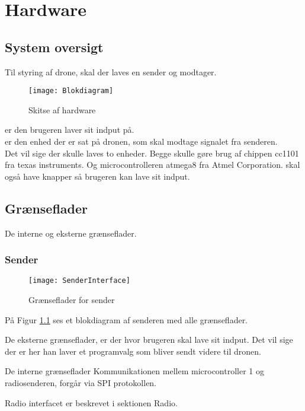 \documentclass[Main]{subfiles}
\begin{document}
\chapter{Hardware}

\section{System oversigt}

Til styring af drone, skal der laves en sender og modtager.

\begin{figure}[H]
\centering
\texttt{[image: Blokdiagram]}
\caption{Skitse af hardware}
\end{figure}

 er den brugeren laver sit indput på. 
\\  er den enhed der er sat på dronen, som skal modtage signalet fra senderen.\\
Det vil sige der skulle laves to enheder. Begge skulle gøre brug af chippen cc1101 fra texas instruments. Og microcontrolleren atmega8 fra Atmel Corporation.
 skal også have knapper så brugeren kan lave sit indput.

\section{Grænseflader}

De interne og eksterne grænseflader. 

\subsection{Sender}
\begin{figure}[H]
\centering
\texttt{[image: SenderInterface]}
\caption{Grænseflader for sender}
\label{fig: SenderInterface}
\end{figure}

På Figur \ref{fig: SenderInterface} ses et blokdiagram af senderen med alle grænseflader.

De eksterne grænseflader, er der hvor brugeren skal lave sit indput. Det vil sige der er her han laver et programvalg som bliver sendt videre til dronen.

De interne grænseflader
Kommunikationen mellem microcontroller 1 og radiosenderen, forgår via SPI protokollen. 

Radio interfacet er beskrevet i sektionen Radio.
\end{document}
